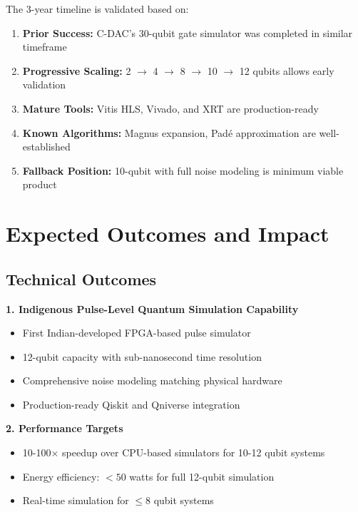 \documentclass[12pt,a4paper]{article}
\begin{document}
The 3-year timeline is validated based on:

\begin{enumerate}[noitemsep]
    \item \textbf{Prior Success:} C-DAC's 30-qubit gate simulator was completed in similar timeframe
    \item \textbf{Progressive Scaling:} 2 $\rightarrow$ 4 $\rightarrow$ 8 $\rightarrow$ 10 $\rightarrow$ 12 qubits allows early validation
    \item \textbf{Mature Tools:} Vitis HLS, Vivado, and XRT are production-ready
    \item \textbf{Known Algorithms:} Magnus expansion, Padé approximation are well-established
    \item \textbf{Fallback Position:} 10-qubit with full noise modeling is minimum viable product
\end{enumerate}

\newpage
\section{Expected Outcomes and Impact}

\subsection{Technical Outcomes}

\textbf{1. Indigenous Pulse-Level Quantum Simulation Capability}
\begin{itemize}[noitemsep]
    \item First Indian-developed FPGA-based pulse simulator
    \item 12-qubit capacity with sub-nanosecond time resolution
    \item Comprehensive noise modeling matching physical hardware
    \item Production-ready Qiskit and Qniverse integration
\end{itemize}

\textbf{2. Performance Targets}
\begin{itemize}[noitemsep]
    \item 10-100$\times$ speedup over CPU-based simulators for 10-12 qubit systems
    \item Energy efficiency: $<50$ watts for full 12-qubit simulation
    \item Real-time simulation for $\leq 8$ qubit systems
\end{itemize}
\end{document}
